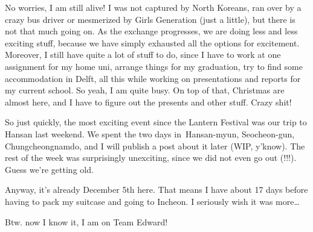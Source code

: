 \begin{post}
	\begin{content}
No worries, I am still alive! I was not captured by North Koreans, ran over by a crazy bus driver or mesmerized by Girls Generation (just a little), but there is not that much going on. As the exchange progresses, we are doing less and less exciting stuff, because we have simply exhausted all the options for excitement. Moreover, I still have quite a lot of stuff to do, since I have to work at one assignment for my home uni, arrange things for my graduation, try to find some accommodation in Delft, all this while working on presentations and reports for my current school. So yeah, I am quite busy. On top of that, Christmas are almost here, and I have to figure out the presents and other stuff. Crazy shit!

So just quickly, the most exciting event since the Lantern Festival was our trip to Hansan last weekend. We spent the two days in Hansan-myun, Seocheon-gun, Chungcheongnamdo, and I will publish a post about it later (WIP, y'know). The rest of the week was surprisingly unexciting, since we did not even go out (!!!). Guess we're getting old.

Anyway, it's already December 5th here. That means I have about 17 days before having to pack my suitcase and going to Incheon. I seriously wish it was more\ldots

Btw. now I know it, I am on Team Edward!
	\end{content}
\end{post}
